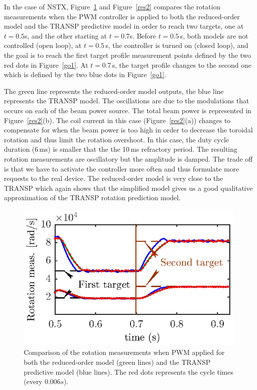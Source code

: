\documentclass[12pt,lot, lof]{puthesis}
\begin{document}
In the case of NSTX, Figure~\ref{res1} and Figure~\ref{res2} compares the rotation measurements when the PWM controller is applied to both the reduced-order model and the TRANSP predictive model in order to reach two targets, one at $t = 0.5$s, and the other starting at $t=0.7$s.
Before $t=0.5$\,s, both models are not controlled (open loop), at $t = 0.5$\,s, the controller is turned on (closed loop), and the goal is to reach the first target profile measurement points defined by the two red dots in Figure~\ref{go1}. At $t = 0.7$\,s, the  target profile changes to the second one which is defined by the two blue dots in Figure~\ref{go1}.

The green line represents the reduced-order model outputs, the blue line represents the TRANSP model. The oscillations are due to the modulations that occurs on each of the beam power source. The total beam power is represented in Figure~\ref{res2}(b). The coil current in this case (Figure~\ref{res2}(a)) changes to compensate for when the beam power is too high in order to decrease the toroidal rotation and thus limit the rotation overshoot.
In this case, the duty cycle duration (6\,ms) is smaller that the the 10\,ms refractory period.
The resulting rotation measurements are oscillatory but the amplitude is damped. The trade off is that we have to activate the controller more often and thus formulate more requests to the real device.
The reduced-order model is very close to the TRANSP which again shows that the simplified model gives us a good qualitative approximation of the TRANSP rotation prediction model.

\begin{figure}[htbp]
	\centering
	\includegraphics[width= 0.7\linewidth]{fig18}
	\caption{Comparison of the rotation measurements when PWM applied for both the reduced-order model (green lines) and the TRANSP predictive model (blue lines). The red dots represents the cycle times (every $0.006 s$).}
	\label{res1}
\end{figure}
\end{document}
